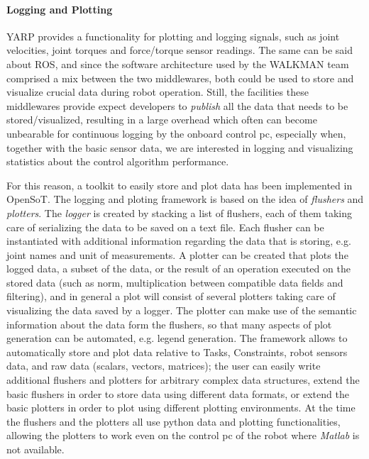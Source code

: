 \paragraph{Logging and Plotting}
\label{par:logging-plotting}
YARP provides a functionality for plotting and logging signals, such as joint velocities, joint torques and force/torque sensor readings.
The same can be said about ROS, and since the software architecture used by the WALKMAN team comprised a mix between the two middlewares, both could be used to store and visualize crucial data during robot operation. Still, the facilities these middlewares provide expect developers to \emph{publish} all the data that needs to be stored/visualized, resulting in a large overhead which often can become unbearable for continuous logging by the onboard control pc, especially when, together with the basic sensor data, we are interested in logging and visualizing statistics about the control algorithm performance.

For this reason, a toolkit to easily store and plot data has been implemented in OpenSoT.
The logging and ploting framework is based on the idea of \emph{flushers} and \emph{plotters}. 
The \emph{logger} is created by stacking a list of flushers, each of them taking care of serializing the data to be saved on a text file. Each flusher can be instantiated with additional information regarding the data that is storing, e.g. joint names and unit of measurements.
A plotter can be created that plots the logged data, a subset of the data, or the result of an operation executed on the stored data (such as norm, multiplication between compatible data fields and filtering), and in general a plot will consist of several plotters taking care of visualizing the data saved by a logger. The plotter can make use of the semantic information about the data form the flushers, so that many aspects of plot generation can be automated, e.g. legend generation.
The framework allows to automatically store and plot data relative to Tasks, Constraints, robot sensors data, and raw data (scalars, vectors, matrices); the user can easily write additional flushers and plotters for arbitrary complex data structures, extend the basic flushers in order to store data using different data formats, or extend the basic plotters in order to plot using different plotting environments.
At the time the flushers and the plotters all use python data and plotting functionalities, allowing the plotters to work even on the control pc of the robot where \emph{Matlab} is not available.

